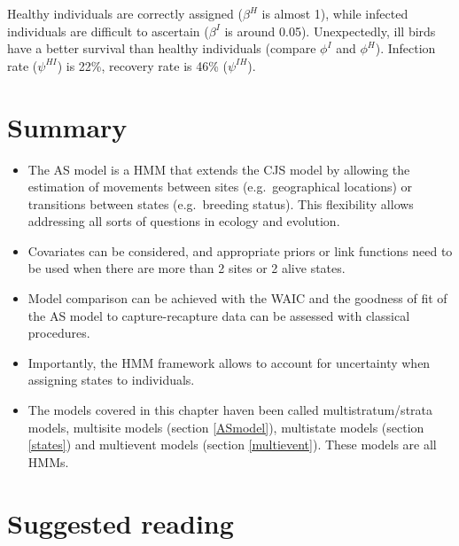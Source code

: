 \documentclass[
  12pt,
]{krantz}
\begin{document}
Healthy individuals are correctly assigned (\(\beta^H\) is almost 1), while infected individuals are difficult to ascertain (\(\beta^I\) is around 0.05). Unexpectedly, ill birds have a better survival than healthy individuals (compare \(\phi^I\) and \(\phi^H\)). Infection rate (\(\psi^{HI}\)) is 22\%, recovery rate is 46\% (\(\psi^{IH}\)).

\section{Summary}\label{summary-4}

\begin{itemize}
\item
  The AS model is a HMM that extends the CJS model by allowing the estimation of movements between sites (e.g.~geographical locations) or transitions between states (e.g.~breeding status). This flexibility allows addressing all sorts of questions in ecology and evolution.
\item
  Covariates can be considered, and appropriate priors or link functions need to be used when there are more than 2 sites or 2 alive states.
\item
  Model comparison can be achieved with the WAIC and the goodness of fit of the AS model to capture-recapture data can be assessed with classical procedures.
\item
  Importantly, the HMM framework allows to account for uncertainty when assigning states to individuals.
\item
  The models covered in this chapter haven been called multistratum/strata models, multisite models (section \ref{ASmodel}), multistate models (section \ref{states}) and multievent models (section \ref{multievent}). These models are all HMMs.
\end{itemize}

\section{Suggested reading}\label{suggested-reading-4}
\end{document}

